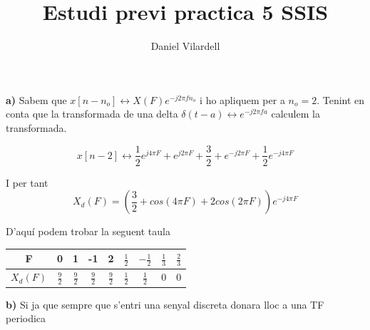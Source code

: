 \documentclass[12pt, a4papre]{article}
\author{Daniel Vilardell}
\title{Estudi previ practica 5 SSIS}
\date{}
\begin{document}

	\maketitle
	\section{}
	
	\textbf{a)} Sabem que $x[n - n_o] \leftrightarrow X(F)e^{-j2\pi fn_o}$ i ho apliquem per a $n_o= 2$. Tenint en conta que la transformada de una delta $\delta(t - a) \leftrightarrow e^{-j2\pi fa}$ calculem la transformada.
	
	\[
	x[n - 2] \leftrightarrow  \frac{1}{2}e^{j4\pi F} + e^{j2\pi F}  + \frac{3}{2} + e^{-j2\pi F} + \frac{1}{2}e^{-j4\pi F} 
	\]	
	
	I per tant
	\[
	X_d(F) =  (\frac{3}{2} +  cos(4\pi F) + 2cos(2\pi F))e^{-j4\pi F}
	\]
	
	D'aquí podem trobar la seguent taula
	
	\begin{center}
	\begin{tabular}{| c c c c c c c c c |}
	\hline
		F		&0			&1			&-1			&2			&$\frac{1}{2}$		&$-\frac{1}{2}$		&$\frac{1}{3}$		&$\frac{2}{3}$\\ \hline
		$X_d(F)$	&$\frac{9}{2}$	&$\frac{9}{2}$	&$\frac{9}{2}$	&$\frac{9}{2}$	&$\frac{1}{2}$		&$\frac{1}{2}$		&0				&0\\ \hline
	\end{tabular}
	\end{center}
	
	
	\textbf{b)} Si ja que sempre que s'entri una senyal discreta donara lloc a una TF periodica
	
	\section{}
	
\end{document}
